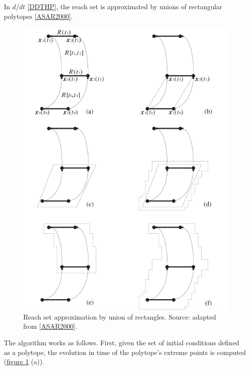 \documentclass[letterpaper,10pt,english]{sphinxmanual}
\begin{document}
In $d/dt$ {\hyperref[main_source:ddthp]{{[}DDTHP{]}}}, the reach set is approximated by
unions of rectangular polytopes {\hyperref[main_source:asar2000]{{[}ASAR2000{]}}}.
\begin{figure}[htbp]
\centering
\capstart

\includegraphics{ddt.png}
\caption{Reach set approximation by union of rectangles. Source: adapted from {\hyperref[main_source:asar2000]{{[}ASAR2000{]}}}.}\label{main_source:ddtfig}\end{figure}

The algorithm works as follows. First, given the set of initial
conditions defined as a polytope, the evolution in time of the
polytope’s extreme points is computed (\hyperref[main_source:ddtfig]{figure  \ref*{main_source:ddtfig}} (a)).
\end{document}
